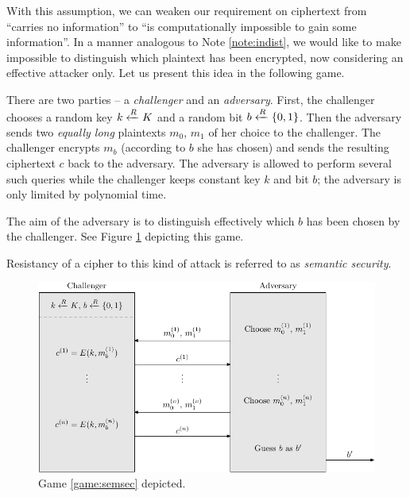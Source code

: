 With this assumption, we can weaken our requirement on ciphertext from ``carries no information'' to ``is computationally impossible to gain some information''. In a manner analogous to Note \ref{note:indist}, we would like to make impossible to distinguish which plaintext has been encrypted, now considering an effective attacker only. Let us present this idea in the following game.

\begin{game}
\label{game:semsec}
	There are two parties -- a {\em challenger} and an {\em adversary}. First, the challenger chooses a random key $k\xleftarrow{R} K$ and a random bit $b\xleftarrow{R}\{0,1\}$. Then the adversary sends two {\em equally long} plaintexts $m_0$, $m_1$ of her choice to the challenger. The challenger encrypts $m_b$ (according to $b$ she has chosen) and sends the resulting ciphertext $c$ back to the adversary. The adversary is allowed to perform several such queries while the challenger keeps constant key $k$ and bit $b$; the adversary is only limited by polynomial time.
	
	The aim of the adversary is to distinguish effectively which $b$ has been chosen by the challenger. See Figure \ref{fig:semsecgame} depicting this game.
\end{game}

\begin{note}
\label{note:semsec}
	Resistancy of a cipher to this kind of attack is referred to as {\em semantic security}.
\end{note}

\begin{figure}[H]
\begin{center}
	\includegraphics{./figures/game_semsec/game_semsec-1.pdf}
	\caption{Game \ref{game:semsec} depicted.}
	\label{fig:semsecgame}
\end{center}
\end{figure}

